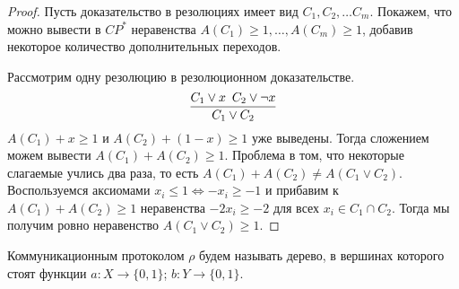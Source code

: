 \begin{proof}
Пусть доказательство в резолюциях имеет вид $C_1, C_2, \ldots C_m$.
Покажем, что можно вывести в $CP^*$ неравенства $A(C_1) \ge 1, \ldots, A(C_m) \ge 1$,
добавив некоторое количество дополнительных переходов.

Рассмотрим одну резолюцию в резолюционном доказательстве.
$${C_1 \lor x \,\,\, C_2 \lor \lnot x \over C_1 \lor C_2}$$
$A(C_1) + x \ge 1$ и $A(C_2) + (1 - x) \ge 1$ уже выведены. Тогда
сложением можем вывести $A(C_1) + A(C_2) \ge 1$. Проблема в том, что некоторые
слагаемые учлись два раза, то есть $A(C_1) + A(C_2) \neq A(C_1 \lor C_2)$.
Воспользуемся аксиомами $x_i \le 1 \iff -x_i \ge -1$ и прибавим
к $A(C_1) + A(C_2) \ge 1$ неравенства $-2x_i \ge -2$ для всех $x_i \in C_1 \cap C_2$.
Тогда мы получим ровно неравенство $A(C_1 \lor C_2) \ge 1$.  
\end{proof}

\begin{definition}
Коммуникационным протоколом $\rho$ будем называть дерево, в вершинах которого
стоят функции $a: X \to \{0,1\}$; $b: Y \to \{0,1\}$.
\end{definition}
